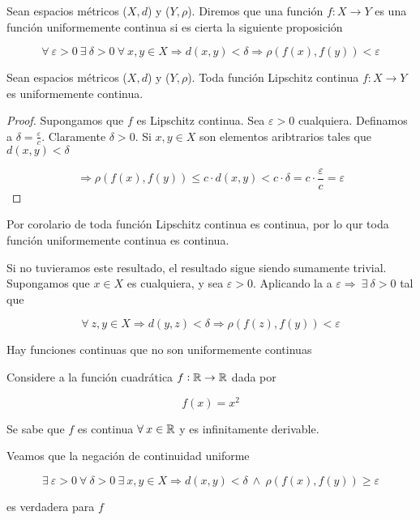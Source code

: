 \begin{definition}  \label{defcont}
    Sean espacios métricos ($X,d$) y ($Y,\rho$). Diremos que una función $f : X \to Y$ es una función uniformemente continua si es cierta la siguiente proposición

    $$\forall \: \varepsilon > 0 \: \exists \: \delta > 0 \: \forall \: x,y \in X \Rightarrow d(x,y) < \delta \Rightarrow \rho(f(x),f(y)) < \varepsilon$$
\end{definition}

\begin{theorem}
    Sean espacios métricos ($X,d$) y ($Y,\rho$). Toda función Lipschitz continua $f: X \to Y$ es uniformemente continua.
\end{theorem}

\begin{proof}
    Supongamos que $f$ es Lipschitz continua. Sea $\varepsilon > 0$ cualquiera. Definamos a $\delta = \frac{\varepsilon}{c}$. Claramente $\delta > 0$. Si $x,y \in X$ son elementos aribtrarios tales que $d(x,y) < \delta$

    $$\Rightarrow \rho(f(x),f(y)) \leqslant c \cdot d(x,y) < c \cdot \delta = c \cdot \frac{\varepsilon}{c} = \varepsilon$$
\end{proof}

\begin{corollary}
    Por corolario de  toda función Lipschitz continua es continua, por lo qur toda función uniformemente continua es continua.
\end{corollary}

\begin{orangeproof}
    Si no tuvieramos este resultado, el resultado sigue siendo sumamente trivial. Supongamos que $x \in X$ es cualquiera, y sea $\varepsilon > 0$. Aplicando la  a $\varepsilon \Rightarrow \: \exists \: \delta > 0$ tal que

    $$\forall \: z,y \in X \Rightarrow d(y,z) < \delta \Rightarrow \rho(f(z),f(y)) < \varepsilon$$
\end{orangeproof}

\begin{remark}
    Hay funciones continuas que no son uniformemente continuas
\end{remark}

\begin{eg}
    Considere a la función cuadrática $f : \mathbb{R} \to \mathbb{R}$ dada por 

    $$f(x) = x^2$$

    Se sabe que $f$ es continua $\forall \: x \in \mathbb{R}$ y es infinitamente derivable.

    Veamos que la negación de continuidad uniforme

    $$\exists \: \varepsilon > 0 \: \forall \: \delta > 0 \: \exists \: x,y \in X \Rightarrow d(x,y) < \delta \: \wedge \: \rho(f(x),f(y)) \geqslant \varepsilon$$

    es verdadera para $f$
\end{eg}

